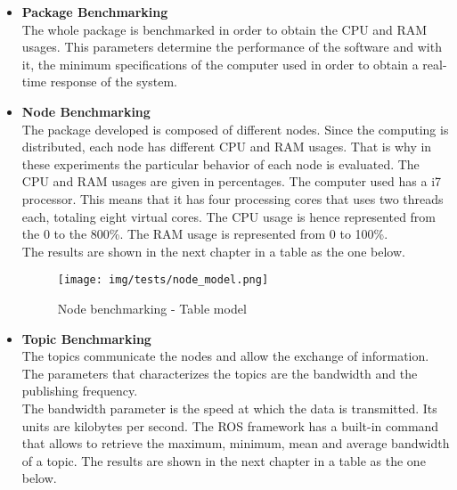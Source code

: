 	\begin{itemize}
		\item{\textbf{Package Benchmarking}}
		\\
		The whole package is benchmarked in order to obtain the CPU and RAM usages. 
		This parameters determine the performance of the software and with it, the minimum specifications of the computer used in order to obtain a real-time response of the system.  
		\\[0.5cm]

		\item{\textbf{Node Benchmarking}}
		\\
		The package developed is composed of different nodes. 
		Since the computing is distributed, each node has different CPU and RAM usages.
		That is why in these experiments the particular behavior of each node is evaluated. 
		The CPU and RAM usages are given in percentages. 
		The computer used has a i7 processor. 
		This means that it has four processing cores that uses two threads each, totaling eight virtual cores. 
		The CPU usage is hence represented from the 0 to the 800\%.
		The RAM usage is represented from 0 to 100\%.
		\\[0.5cm]
		The results are shown in the next chapter in a table as the one below. 

		\begin{figure}[h]
				\begin{center}
			    \texttt{[image: img/tests/node\_model.png]}
				\caption[Node benchmarking - Table model]{Node benchmarking - Table model}
				\end{center}
		\end{figure}

		\item{\textbf{Topic Benchmarking}}\\
		The topics communicate the nodes and allow the exchange of information. 
		The parameters that characterizes the topics are the bandwidth and the publishing frequency.
		\\

		The bandwidth parameter is the speed at which the data is transmitted. 
		Its units are kilobytes per second. 
		The ROS framework has a built-in command that allows to retrieve the maximum, minimum, mean and average bandwidth of a topic. 
		The results are shown in the next chapter in a table as the one below. 


\end{itemize}

